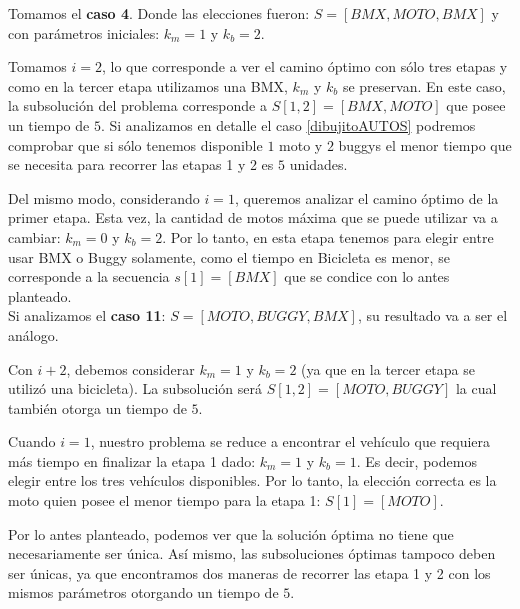 Tomamos el \textbf{caso 4}. Donde las elecciones fueron: $S=[BMX, MOTO, BMX]$ y con par\'ametros iniciales: $k_m=1$ y $k_b=2$.

Tomamos $i=2$, lo que corresponde a ver el camino \'optimo con s\'olo tres etapas y como en la tercer etapa utilizamos una BMX, $k_m$ y $k_b$ se preservan. En este caso, la subsoluci\'on del problema corresponde a $S[1,2]=[BMX, MOTO]$ que posee un tiempo de $5$. Si analizamos en detalle el caso \ref{dibujitoAUTOS} podremos comprobar que si s\'olo tenemos disponible $1$ moto y $2$ buggys el menor tiempo que se necesita para recorrer las etapas 1 y 2 es $5$ unidades. 

Del  mismo modo, considerando $i=1$, queremos analizar el camino \'optimo de la primer etapa. Esta vez, la cantidad de motos m\'axima que se puede utilizar va a cambiar: $k_m=0$ y $k_b=2$. Por lo tanto, en esta etapa tenemos para elegir entre usar BMX o Buggy solamente, como el tiempo en Bicicleta es menor, se corresponde a la secuencia $s[1]=[BMX]$ que se condice con lo antes planteado.\\

Si analizamos el \textbf{caso 11}: $S=[MOTO, BUGGY, BMX]$, su resultado va a ser el an\'alogo.

Con $i+2$, debemos considerar $k_m=1$ y $k_b=2$ (ya que en la tercer etapa se utiliz\'o una bicicleta). La subsoluci\'on ser\'a $S[1,2]=[MOTO, BUGGY]$ la cual tambi\'en otorga un tiempo de $5$.

Cuando $i=1$, nuestro problema se reduce a encontrar el veh\'iculo que requiera m\'as tiempo en finalizar la etapa 1 dado: $k_m=1$ y $k_b=1$. Es decir, podemos elegir entre los tres veh\'iculos disponibles. Por lo tanto, la elecci\'on correcta es la moto quien posee el menor tiempo para la etapa 1: $S[1]=[MOTO]$.\\


\bigskip

Por lo antes planteado, podemos ver que la soluci\'on \'optima no tiene que necesariamente ser \'unica. As\'i mismo, las subsoluciones \'optimas tampoco deben ser \'unicas, ya que encontramos dos maneras de recorrer las etapa 1 y 2 con los mismos par\'ametros otorgando un tiempo de $5$.\\




